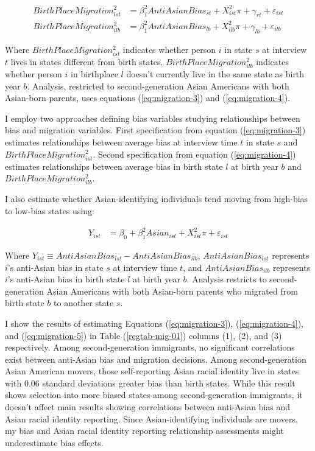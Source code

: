 \begin{align}
BirthPlaceMigration_{ist}^2 &= \beta_1^2 AntiAsianBias_{st} 
                   + X_{ist}^2\pi + \gamma_{rt} 
                   + \varepsilon_{ist} \label{eq:migration-3} \\
BirthPlaceMigration_{ilb}^2 &= \beta_1^2 AntiAsianBias_{lb} 
                   + X_{ilb}^2\pi + \gamma_{lb} 
                   + \varepsilon_{ilb} \label{eq:migration-4}
\end{align}

Where $BirthPlaceMigration_{ist}^2$ indicates whether person $i$ in state $s$ at interview $t$ lives in states different from birth states. $BirthPlaceMigration_{ilb}^2$ indicates whether person $i$ in birthplace $l$ doesn't currently live in the same state as birth year $b$. Analysis, restricted to second-generation Asian Americans with both Asian-born parents, uses equations (\ref{eq:migration-3}) and (\ref{eq:migration-4}).

I employ two approaches defining bias variables studying relationships between bias and migration variables. First specification from equation (\ref{eq:migration-3}) estimates relationships between average bias at interview time $t$ in state $s$ and $BirthPlaceMigration_{ist}^2$. Second specification from equation (\ref{eq:migration-4}) estimates relationships between average bias in birth state $l$ at birth year $b$ and $BirthPlaceMigration_{ilb}^2$.

I also estimate whether Asian-identifying individuals tend moving from high-bias to low-bias states using:

\begin{align}
Y_{ist} &= \beta_0 + \beta_1^2 Asian_{ist} +
                   X_{ist}^2\pi
                   + \varepsilon_{ist} \label{eq:migration-5}
\end{align}

Where $Y_{ist} \equiv AntiAsianBias_{ist} - AntiAsianBias_{ilb}$, $AntiAsianBias_{ist}$ represents $i$'s anti-Asian bias in state $s$ at interview time $t$, and $AntiAsianBias_{ilb}$ represents $i$'s anti-Asian bias in birth state $l$ at birth year $b$. Analysis restricts to second-generation Asian Americans with both Asian-born parents who migrated from birth state $b$ to another state $s$.

I show the results of estimating Equations (\ref{eq:migration-3}), (\ref{eq:migration-4}), and (\ref{eq:migration-5}) in Table (\ref{regtab-mig-01}) columns (1), (2), and (3) respectively. Among second-generation immigrants, no significant correlations exist between anti-Asian bias and migration decisions. Among second-generation Asian American movers, those self-reporting Asian racial identity live in states with 0.06 standard deviations greater bias than birth states. While this result shows selection into more biased states among second-generation immigrants, it doesn't affect main results showing correlations between anti-Asian bias and Asian racial identity reporting. Since Asian-identifying individuals are movers, my bias and Asian racial identity reporting relationship assessments might underestimate bias effects.

